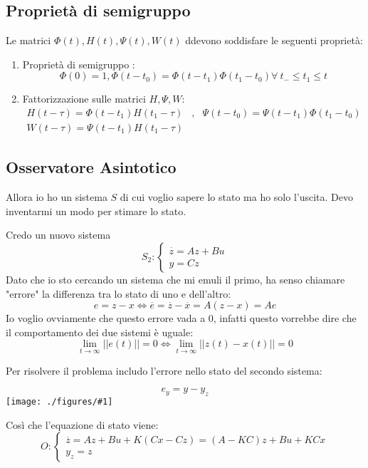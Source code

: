 \documentclass{article}
\newcommand{\incfig}[2]{%
	\texttt{[image: ./figures/\#1]}%
}
\begin{document}
\subsection{Proprietà di semigruppo}
Le matrici $\Phi(t),H(t),\Psi(t),W(t)$ ddevono soddisfare le seguenti proprietà:

\begin{enumerate}
    \item Proprietà di semigruppo : \[ \Phi(0)=1,\Phi(t-t_0) = \Phi(t-t_1)\Phi(t_1-t_0) \forall\ t_-\le t_1\le t\]
    \item Fattorizzazione sulle matrici $H,\Psi,W$:
    \begin{align*}
        H(t-\tau) = \Phi(t-t_1)H(t_1-\tau) &,& \Psi(t-t_0)=\Psi(t-t_1)\Phi(t_1-t_0)\\
        W(t-\tau) = \Psi(t-t_1)H(t_1-\tau) &
    \end{align*}
\end{enumerate}



\subsection{Osservatore Asintotico}
Allora io ho un sistema $S$ di cui voglio sapere lo stato ma ho solo l'uscita. Devo inventarmi un modo per stimare lo stato.

Credo un nuovo sistema 
\[
    S_2 : \begin{cases} \overset{\cdot}{z} = Az+Bu\\
        y = Cz 
    \end{cases}    
\]
Dato che io sto cercando un sistema che mi emuli il primo, ha senso chiamare "errore" la differenza tra lo stato di uno e dell'altro:
\[
e = z-x \Longleftrightarrow \overset{\cdot}{e}  = \overset{\cdot}{z}-\overset{\cdot}{x} = A(z-x) = Ae  
\]
Io voglio ovviamente che questo errore vada a 0, infatti questo vorrebbe dire che il comportamento dei due sistemi è uguale:
\[
\lim_{t\to\infty}||e(t)|| = 0 \Longleftrightarrow \lim_{t\to\infty}||z(t)-x(t)|| = 0    
\]

Per risolvere il problema includo l'errore nello stato del secondo sistema:


\[e_y = y-y_z\]
\incfig{oss_asint.jpeg}{0.7}

Così che l'equazione di stato viene:
\[
O : \begin{cases}
    \overset{\cdot}{z}= Az +Bu+K(Cx-Cz) = (A-KC)z+Bu+KCx   \\
    y_z = z
    \end{cases}
\]
\end{document}
